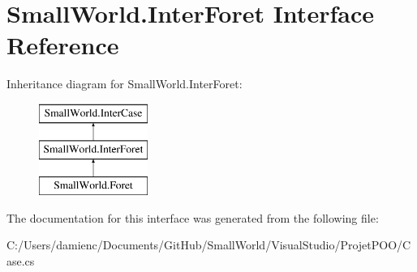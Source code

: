 \hypertarget{interface_small_world_1_1_inter_foret}{\section{Small\-World.\-Inter\-Foret Interface Reference}
\label{interface_small_world_1_1_inter_foret}
}
Inheritance diagram for Small\-World.\-Inter\-Foret\-:\begin{figure}[H]
\begin{center}
\leavevmode
\includegraphics[height=3.000000cm]{interface_small_world_1_1_inter_foret}
\end{center}
\end{figure}


The documentation for this interface was generated from the following file\-:\begin{DoxyCompactItemize}
\item 
C\-:/\-Users/damienc/\-Documents/\-Git\-Hub/\-Small\-World/\-Visual\-Studio/\-Projet\-P\-O\-O/Case.\-cs\end{DoxyCompactItemize}
